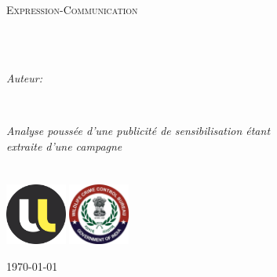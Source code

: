 \documentclass[
12pt, 
french, 
singlespacing,
headsepline,
]{Analyse}
\author{Alexandre \textsc{GERARD}}
\begin{document}
\frontmatter

\pagestyle{plain}


\begin{titlepage}
\begin{center}

\vspace*{.05\textheight}
{\scshape\LARGE \univname\par}\vspace{1.5cm}
\textsc{\Large Expression-Communication}\\[0.5cm]

\HRule \\[0.4cm]
{\huge \bfseries \ttitle\par}\vspace{0.4cm}
\HRule \\[1.5cm]
 
\begin{minipage}[t]{1\textwidth}
\begin{center} \large
\emph{Auteur:}\\
\href{https://agerard57.github.io/}{\authorname}
\end{center}
\end{minipage}
\begin{minipage}[t]{0.4\textwidth}
\end{minipage}\\[3cm]
 
\vfill

\large \textit{Analyse poussée d'une publicité de sensibilisation étant\\ extraite d'une campagne }\\[0.3cm]
\vspace*{15mm}
\groupname\\\deptname\\[2cm]
\includegraphics[width=20mm]{medias/ul.png}
\includegraphics[width=20mm]{medias/WCCB.png}

\vfill

{\large \today}\\[4cm]

 
\vfill
\end{center}
\end{titlepage}
\end{document}
